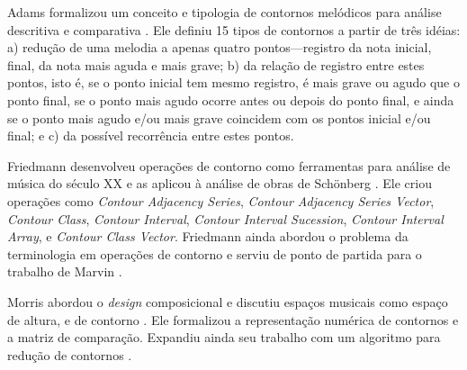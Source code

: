 \documentclass[12pt]{article}
\newcommand{\eng}[1]{\textit{#1}}
\begin{document}


Adams formalizou um conceito e tipologia de contornos melódicos para
análise descritiva e comparativa \cite{adams76:melodic}. Ele definiu
15 tipos de contornos a partir de três idéias: a) redução de uma
melodia a apenas quatro pontos---registro da nota inicial, final, da
nota mais aguda e mais grave; b) da relação de registro entre estes
pontos, isto é, se o ponto inicial tem mesmo registro, é mais grave ou
agudo que o ponto final, se o ponto mais agudo ocorre antes ou depois
do ponto final, e ainda se o ponto mais agudo e/ou mais grave
coincidem com os pontos inicial e/ou final; e c) da possível
recorrência entre estes pontos.


Friedmann desenvolveu operações de contorno como ferramentas para
análise de música do século XX e as aplicou à análise de obras de
Schönberg \cite{friedmann85:methodology}. Ele criou operações como
\eng{Contour Adjacency Series}, \eng{Contour Adjacency Series Vector},
\eng{Contour Class}, \eng{Contour Interval}, \eng{Contour Interval
  Sucession}, \eng{Contour Interval Array}, e \eng{Contour Class
  Vector}. Friedmann ainda abordou o problema da terminologia em
operações de contorno \cite{friedmann87:response} e serviu de ponto de
partida para o trabalho de Marvin \cite{marvin88:generalized}.


Morris abordou o \eng{design} composicional e discutiu espaços
musicais como espaço de altura, e de contorno
\cite{morris87:composition}. Ele formalizou a representação numérica
de contornos e a matriz de comparação. Expandiu ainda seu trabalho com
um algoritmo para redução de contornos \cite{morris93:directions}.

\end{document}
